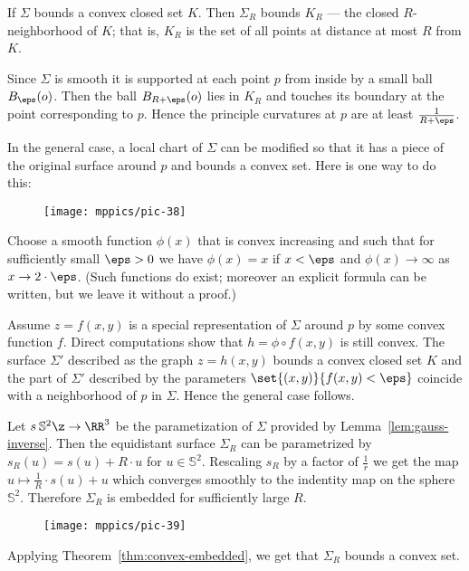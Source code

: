 If $\Sigma$ bounds a convex closed set $K$.
Then $\Sigma_R$ bounds $K_R$ --- the closed $R$-neighborhood of $K$;
that is, $K_R$ is the set of all points at distance at most $R$ from $K$.

Since $\Sigma$ is smooth it is supported at each point $p$ from inside by a small ball $B_\eps(o)$.
Then the ball $B_{R+\eps}(o)$ lies in $K_R$ and touches its boundary at the point corresponding to $p$.
Hence the principle curvatures at $p$ are at least $\tfrac1{R+\eps}$.

In the general case, a local chart of $\Sigma$ can be modified so that it has a piece of the original surface around $p$  and bounds a convex set.
Here is one way to do this:

\begin{wrapfigure}{o}{30 mm}
\vskip-0mm
\centering
\texttt{[image: mppics/pic-38]}
\vskip-0mm
\end{wrapfigure}

Choose a smooth function $\phi(x)$ that is convex increasing and such that for sufficiently small $\eps>0$ we have $\phi(x)=x$ if $x<\eps$ and $\phi(x)\to\infty$ as $x\to 2\cdot\eps$.
(Such functions do exist; moreover an explicit formula can be written, but we leave it without a proof.)

Assume $z=f(x,y)$ is a special representation of $\Sigma$ around $p$ by some convex function $f$.
Direct computations show that $h=\phi\circ f(x,y)$ is still convex.
The surface $\Sigma'$ described as the graph $z=h(x,y)$ bounds a convex closed set $K$ and the part of $\Sigma'$ described by 
the parameters $\set{(x,y)}{f(x,y)<\eps}$ coincide with a neighborhood of $p$ in $\Sigma$.
Hence the general case follows.\qeds

Let $s\:\mathbb{S}^2\z\to\RR^3$ be the parametization of $\Sigma$ provided by Lemma~\ref{lem:gauss-inverse}.
Then the equidistant surface $\Sigma_R$ can be parametrized by $s_R(u)= s(u)+R\cdot u$ for $u\in\mathbb{S}^2$.
Rescaling $s_R$ by a  factor of $\tfrac1r$ we get the map $u\mapsto \tfrac1R\cdot s(u)+u$ which converges smoothly to the indentity map on the sphere $\mathbb{S}^2$.
Therefore $\Sigma_R$ is embedded for sufficiently large $R$.

\begin{wrapfigure}{o}{47 mm}
\vskip-0mm
\centering
\texttt{[image: mppics/pic-39]}
\vskip-0mm
\end{wrapfigure}

Applying Theorem~\ref{thm:convex-embedded}, we get that $\Sigma_R$ bounds a convex set.

